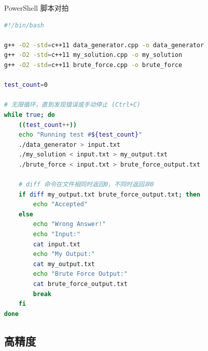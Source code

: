 PowerShell 脚本对拍

\begin{lstlisting}[language=bash]
#!/bin/bash

g++ -O2 -std=c++11 data_generator.cpp -o data_generator
g++ -O2 -std=c++11 my_solution.cpp -o my_solution
g++ -O2 -std=c++11 brute_force.cpp -o brute_force

test_count=0

# 无限循环，直到发现错误或手动停止 (Ctrl+C)
while true; do
    ((test_count++))
    echo "Running test #${test_count}"
    ./data_generator > input.txt
    ./my_solution < input.txt > my_output.txt
    ./brute_force < input.txt > brute_force_output.txt

    # diff 命令在文件相同时返回0，不同时返回非0
    if diff my_output.txt brute_force_output.txt; then
        echo "Accepted"
    else
        echo "Wrong Answer!"
        echo "Input:"
        cat input.txt
        echo "My Output:"
        cat my_output.txt
        echo "Brute Force Output:"
        cat brute_force_output.txt
        break
    fi
done
\end{lstlisting}

\subsection{高精度}

